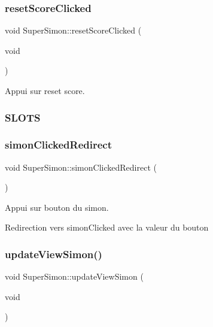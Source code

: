 \mbox{\label{class_super_simon_a81bff9afba77880d36563aac5534ccd3}} 
\subsubsection{\texorpdfstring{reset\+Score\+Clicked}{resetScoreClicked}}
{\footnotesize\ttfamily void Super\+Simon\+::reset\+Score\+Clicked (\begin{DoxyParamCaption}\item[{void}]{ }\end{DoxyParamCaption})\hspace{0.3cm}{\ttfamily [slot]}}



Appui sur reset score. 



 \subsubsection*{S\+L\+O\+TS }\mbox{\label{class_super_simon_af495f2a329d2966c2f265cb46753a13d}} 
\subsubsection{\texorpdfstring{simon\+Clicked\+Redirect}{simonClickedRedirect}}
{\footnotesize\ttfamily void Super\+Simon\+::simon\+Clicked\+Redirect (\begin{DoxyParamCaption}{ }\end{DoxyParamCaption})\hspace{0.3cm}{\ttfamily [slot]}}



Appui sur bouton du simon. 

Redirection vers simon\+Clicked avec la valeur du bouton \mbox{\label{class_super_simon_a8d5c23562cd6b048720003d3c796ac7a}} 
\subsubsection{\texorpdfstring{update\+View\+Simon()}{updateViewSimon()}}
{\footnotesize\ttfamily void Super\+Simon\+::update\+View\+Simon (\begin{DoxyParamCaption}\item[{void}]{ }\end{DoxyParamCaption})}



